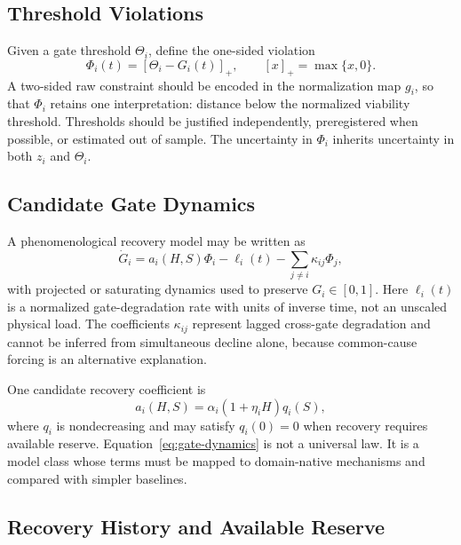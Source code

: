 \subsection{Threshold Violations}

Given a gate threshold \(\Theta_i\), define the one-sided violation
\begin{equation}
    \Phi_i(t)
    =
    [\Theta_i-G_i(t)]_+,
    \qquad
    [x]_+=\max\{x,0\}.
    \label{eq:violation-variable}
\end{equation}
A two-sided raw constraint should be encoded in the normalization map \(g_i\), so that \(\Phi_i\) retains one interpretation: distance below the normalized viability threshold. Thresholds should be justified independently, preregistered when possible, or estimated out of sample. The uncertainty in \(\Phi_i\) inherits uncertainty in both \(z_i\) and \(\Theta_i\).

\subsection{Candidate Gate Dynamics}

A phenomenological recovery model may be written as
\begin{equation}
    \dot G_i
    =
    a_i(H,S)\Phi_i
    -
    \ell_i(t)
    -
    \sum_{j\neq i}\kappa_{ij}\Phi_j,
    \label{eq:gate-dynamics}
\end{equation}
with projected or saturating dynamics used to preserve \(G_i\in[0,1]\). Here \(\ell_i(t)\) is a normalized gate-degradation rate with units of inverse time, not an unscaled physical load. The coefficients \(\kappa_{ij}\) represent lagged cross-gate degradation and cannot be inferred from simultaneous decline alone, because common-cause forcing is an alternative explanation.

One candidate recovery coefficient is
\begin{equation}
    a_i(H,S)
    =
    \alpha_i(1+\eta_i H)q_i(S),
    \label{eq:recovery-coefficient}
\end{equation}
where \(q_i\) is nondecreasing and may satisfy \(q_i(0)=0\) when recovery requires available reserve. Equation~\eqref{eq:gate-dynamics} is not a universal law. It is a model class whose terms must be mapped to domain-native mechanisms and compared with simpler baselines.

\subsection{Recovery History and Available Reserve}

